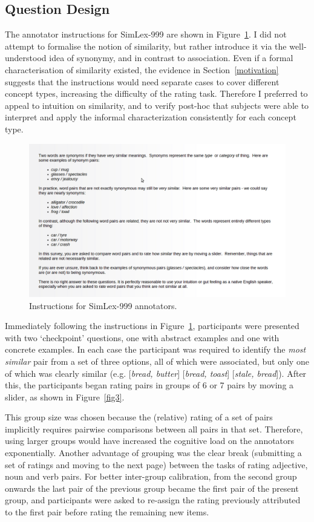 \subsection{Question Design}

The annotator instructions for SimLex-999 are shown in Figure~\ref{fig2}. I did not attempt to formalise the notion of similarity, but rather introduce it via the well-understood idea of synonymy, and in contrast to association. Even if a formal characterisation of similarity existed, the evidence in Section~\ref{motivation} suggests that the instructions would need separate cases to cover different concept types, increasing the difficulty of the rating task. Therefore I preferred to appeal to intuition on similarity, and to verify post-hoc that subjects were able to interpret and apply the informal characterization consistently for each concept type. 

\begin{figure}[ht]  \includegraphics[width = \textwidth]{Chapter_2/screenshot1_CL}  \caption{\label{fig2} Instructions for SimLex-999 annotators.}\end{figure} 

Immediately following the instructions in Figure~\ref{fig2}, participants were presented with two `checkpoint' questions, one with abstract examples and one with concrete examples. In each case the participant was required to identify the \emph{most similar} pair from a set of three options, all of which were associated, but only one of which was clearly similar (e.g. [\emph{bread, butter}] [\emph{bread, toast}] [\emph{stale, bread}]). After this, the participants began rating pairs in groups of 6 or 7 pairs by moving a slider, as shown in Figure~\ref{fig3}.

This group size was chosen because the (relative) rating of a set of pairs implicitly requires pairwise comparisons between all pairs in that set. Therefore, using larger groups would have increased the cognitive load on the annotators exponentially. Another advantage of grouping was the clear break (submitting a set of ratings and moving to the next page) between the tasks of rating adjective, noun and verb pairs. For better inter-group calibration, from the second group onwards the last pair of the previous group became the first pair of the present group, and participants were asked to re-assign the rating previously attributed to the first pair before rating the remaining new items.  

